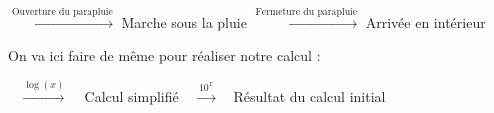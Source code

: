 \documentclass[a4paper]{article}
\begin{document}
\vspace{-0.15cm}

\begin{center}
	 $\xrightarrow{\text{Ouverture du parapluie}}$ {\small Marche sous la pluie} $\xrightarrow{\text{Fermeture du parapluie}}$ {\small Arrivée en intérieur}\\
\end{center}

\vspace{0.1cm}

On va ici faire de même pour réaliser notre calcul : 

\vspace{-0.15cm}

\begin{center}
	 ~ $\xrightarrow{\log(x)}$ ~ {\small Calcul simplifié} ~ $\xrightarrow{10^x}$ ~ {\small Résultat du calcul initial}\\
\end{center}

\vspace{1cm}
\end{document}
